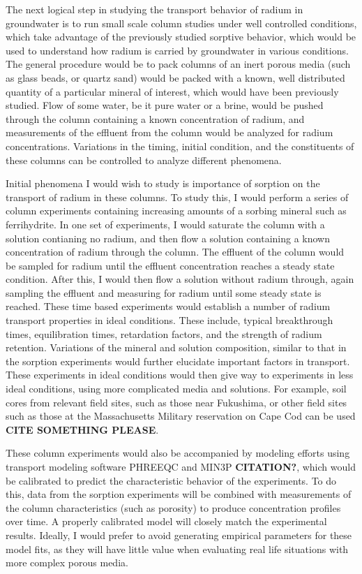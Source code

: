 \documentclass[twoside,12pt,titlepage]{article}
\begin{document}
The next logical step in studying the transport behavior of radium in groundwater is to run small scale column studies under well controlled conditions, which take advantage of the previously studied sorptive behavior, which would be used to understand how radium is carried by groundwater in various conditions. The general procedure would be to pack columns of an inert porous media (such as glass beads, or quartz sand) would be packed with a known, well distributed quantity of a particular mineral of interest, which would have been previously studied. Flow of some water, be it pure water or a brine, would be pushed through the column containing a known concentration of radium, and measurements of the effluent from the column would be analyzed for radium concentrations. Variations in the timing, initial condition, and the constituents of these columns can be controlled to analyze different phenomena.
\par Initial phenomena I would wish to study is importance of sorption on the transport of radium in these columns. To study this, I would perform a series of column experiments containing increasing amounts of a sorbing mineral such as ferrihydrite. In one set of experiments, I would saturate the column with a solution contianing no radium, and then flow a solution containing a known concentration of radium through the column. The effluent of the column would be sampled for radium until the effluent concentration reaches a steady state condition. After this, I would then flow a solution without radium through, again sampling the effluent and measuring for radium until some steady state is reached. These time based experiments would establish a number of radium transport properties in ideal conditions. These include, typical breakthrough times, equilibration times, retardation factors, and the strength of radium retention. Variations of the mineral and solution composition, similar to that in the sorption experiments would further elucidate important factors in transport. These experiments in ideal conditions would then give way to experiments in less ideal conditions, using more complicated media and solutions. For example, soil cores from relevant field sites, such as those near Fukushima, or other field sites such as those at the Massachusetts Military reservation on Cape Cod can be used \textbf{CITE SOMETHING PLEASE}.
\par These column experiments would also be accompanied by modeling efforts using transport modeling software PHREEQC and MIN3P \textbf{CITATION?}, which would be calibrated to predict the characteristic behavior of the experiments. To do this, data from the sorption experiments will be combined with measurements of the column characteristics (such as porosity) to produce concentration profiles over time. A properly calibrated model will closely match the experimental results. Ideally, I would prefer to avoid generating empirical parameters for these model fits, as they will have little value when evaluating real life situations with more complex porous media.
\end{document}
